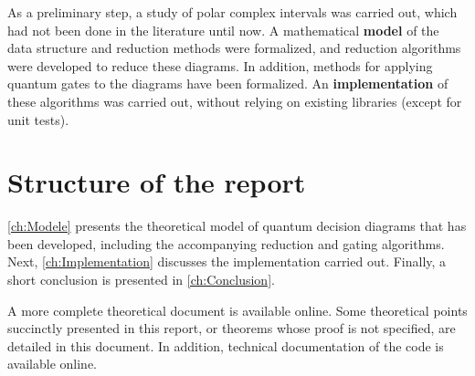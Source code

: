 As a preliminary step, a study of polar complex intervals was carried out, which had not been done in the literature until now.
A mathematical \textbf{model} of the data structure and reduction methods were formalized, and reduction algorithms were developed to reduce these diagrams.
In addition, methods for applying quantum gates to the diagrams have been formalized.
An \textbf{implementation} of these algorithms was carried out, without relying on existing libraries (except for unit tests).

\section{Structure of the report}
\label{sec:Structure}

\autoref{ch:Modele} presents the theoretical model of quantum decision diagrams that has been developed, including the accompanying reduction and gating algorithms. Next, \autoref{ch:Implementation} discusses the implementation carried out. Finally, a short conclusion is presented in \autoref{ch:Conclusion}.

A more complete theoretical document is available online. Some theoretical points succinctly presented in this report, or theorems whose proof is not specified, are detailed in this document. \cite{Leroy_2025} In addition, technical documentation of the code is available online. \cite{Leroy_doc}
